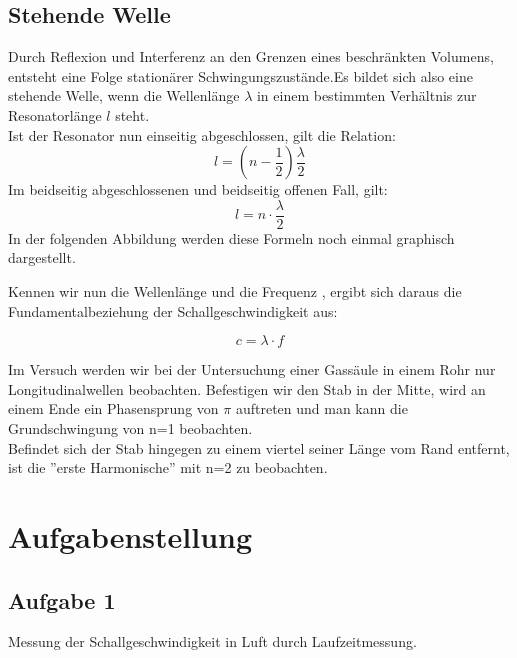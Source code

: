 \documentclass{article}
\begin{document}
{\subsection{Stehende Welle}
Durch Reflexion und Interferenz an den Grenzen eines beschränkten Volumens, entsteht eine Folge stationärer Schwingungszustände.Es bildet sich also eine stehende Welle, wenn die Wellenlänge \(\lambda\) in einem bestimmten Verhältnis zur Resonatorlänge \(l\) steht.\\
Ist der Resonator nun einseitig abgeschlossen, gilt die Relation:
\begin{equation}
\label{l1}
l=\left(n-\frac{1}{2}\right)\frac{\lambda}{2}
\end{equation}
Im beidseitig abgeschlossenen und beidseitig offenen Fall, gilt:
\begin{equation}
l=n\cdot\frac{\lambda}{2}
\end{equation}
In der folgenden Abbildung werden diese Formeln noch einmal graphisch dargestellt.
{\begin{center}
\begin{minipage}{\linewidth}
\centering
\label{welle}
\end{minipage}
\end{center}

Kennen wir nun die Wellenlänge und die Frequenz , ergibt sich daraus die Fundamentalbeziehung der Schallgeschwindigkeit aus:

\begin{equation}
c=\lambda\cdot f
\end{equation}

Im Versuch werden wir bei der Untersuchung einer Gassäule in einem Rohr nur Longitudinalwellen beobachten. Befestigen wir den Stab in der Mitte, wird an einem Ende ein Phasensprung von \(\pi\) auftreten und man kann die Grundschwingung von n=1 beobachten.\\
Befindet sich der Stab hingegen zu einem viertel seiner Länge vom Rand entfernt, ist die ''erste Harmonische'' mit n=2 zu beobachten.\\


\newpage
\section{Aufgabenstellung}
\subsection*{Aufgabe 1}
Messung der Schallgeschwindigkeit in Luft durch Laufzeitmessung.
}}
\end{document}

